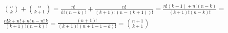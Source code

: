 {\color{solution}
\begin{align*}
\binom{n}{k} + \binom{n}{k+1} = 
\frac{n!}{k!(n-k)!} + \frac{n!}{(k+1)!(n-(k+1))!} =
\frac{n!(k+1) + n!(n-k)}{(k+1)! (n-k)!} = \\
\frac{n!k+n! + n!\,n-n!\,k}{(k+1)! (n-k)!} = 
\frac{(n+1)!}{(k+1)! (n+1-1-k)!} =  \binom{n+1}{k+1}
\end{align*}
}